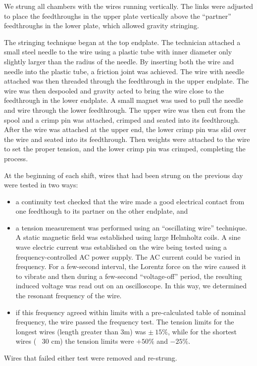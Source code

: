 We strung all chambers with 
the wires running vertically.  The links were adjusted to place the 
feedthroughs in the upper plate vertically above the ``partner''
feedthroughs in the lower plate, which allowed gravity stringing.

The stringing technique began at the top endplate.  The technician attached a 
small steel needle to the wire using a plastic tube with inner diameter only
slightly larger than the radius of the needle.  By inserting both the wire and
needle into the plastic tube, a friction joint was achieved.  
The wire with needle attached was then threaded through the feedthrough in 
the upper endplate.  The wire was then despooled and gravity acted to bring the 
wire close to the feedthrough in the lower endplate.  A small magnet was 
used to pull the needle and wire through the lower feedthrough.  The upper wire
was then cut from the spool and a crimp pin was attached, crimped and seated into
its feedthrough.  After the wire was attached at the upper end, the lower 
crimp pin was slid over the wire and seated into its feedthrough.  Then 
weights were attached to the wire to set the 
proper tension, and the lower crimp pin was crimped, completing the process.

At the beginning of each shift, wires that had been strung on the previous day
were tested in two ways:
\begin{itemize}
\item a continuity test checked that the wire made a good electrical contact
from one feedthough to its partner on the other endplate, and
\item a tension measurement was performed using an ``oscillating wire'' technique.
A static magnetic field was established using large Helmholtz coils.  A sine
wave electric current was established on the wire being tested using a frequency-controlled 
AC power supply.  The AC current could be varied in frequency.  For a 
few-second interval, the Lorentz force on the wire caused it to vibrate and
then during a few-second ``voltage-off'' period, the resulting induced voltage
was read out on an oscilloscope.  In this way, we determined the resonant frequency
of the wire. 
\item if this frequency agreed within limits with a pre-calculated
table of nominal frequency, the wire passed the frequency test.  The tension limits for
the longest wires (length greater than 3m) was $\pm~15\%$, while for the shortest wires
(~ 30 cm) the tension limits were $+50\%$ and $-25\%$.
\end{itemize}
Wires that failed either test were removed and re-strung.

